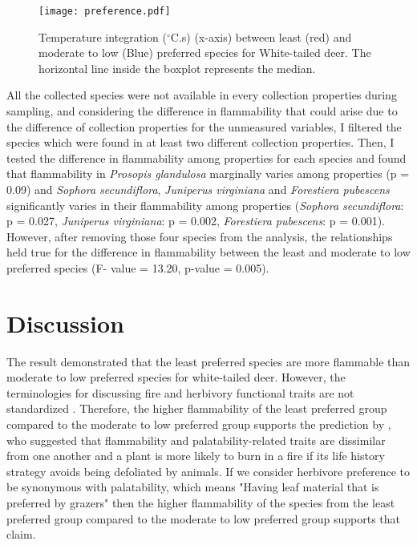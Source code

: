 \documentclass[12pt]{report}
\begin{document}
\begin{figure}
    \centering
    \texttt{[image: preference.pdf]}
    \caption{Temperature integration ($^{\circ}$C.s) (x-axis) between least (red) and moderate to low (Blue) preferred species for White-tailed deer. The horizontal line inside the boxplot represents the median.}   
\end{figure}





 All the collected species were not available in every collection properties during sampling, and considering the difference in flammability that could arise due to the difference of collection properties for the unmeasured variables, I filtered the species which were found in at least two different collection properties. Then, I tested the difference in flammability among properties for each species and found that flammability in \emph{Prosopis glandulosa} marginally varies among properties (p = 0.09) and \emph{Sophora secundiflora}, \emph{Juniperus virginiana} and \emph{Forestiera pubescens} significantly varies in their flammability among properties (\emph{Sophora secundiflora}: p = 0.027, \emph{Juniperus virginiana}: p = 0.002, \emph{Forestiera pubescens}: p = 0.001). However, after removing those four species from the analysis, the relationships held true for the difference in flammability between the least and moderate to low preferred species (F- value = 13.20, p-value = 0.005).

\section{Discussion}

The result demonstrated that the least preferred species are more flammable than moderate to low preferred species for white-tailed deer. However, the terminologies for discussing fire and herbivory functional traits are not standardized \citep{archibald2019unified}. Therefore, the higher flammability of the least preferred group compared to the moderate to low preferred group supports the prediction by \citep{archibald2019unified}, who suggested that flammability and palatability-related traits are dissimilar from one another and a plant is more likely to burn in a fire if its life history strategy avoids being defoliated by animals. If we consider herbivore preference to be synonymous with palatability, which means "Having leaf material that is preferred by grazers" \citep{archibald2019unified} then the higher flammability of the species from the least preferred group compared to the moderate to low preferred group supports that claim.\\
\end{document}
